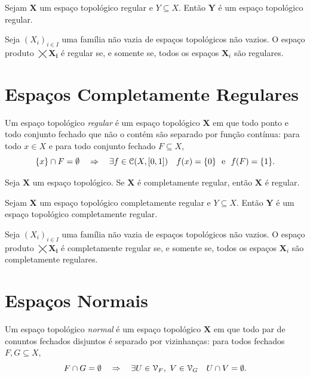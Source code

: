 \begin{prop}
	Sejam $\bm X$ um espaço topológico regular e $Y \subseteq X$. Então $\bm Y$ é um espaço topológico regular.
\end{prop}

\begin{prop}
	Seja $(X_i)_{i \in I}$ uma família não vazia de espaços topológicos não vazios. O espaço produto $\bm{\bigtimes X_i}$ é regular se, e somente se, todos os espaços $\bm X_i$ são regulares.
\end{prop}

\section{Espaços Completamente Regulares}

\begin{defi}
	Um espaço topológico \emph{regular} é um espaço topológico $\bm X$ em que todo ponto e todo conjunto fechado que não o contém são separado por função contínua: para todo $x \in X$ e para todo conjunto fechado $F \subseteq X$,
	\begin{equation*}
	\{x\} \cap F=\emptyset \quad \Rightarrow \quad \exists f \in \mathcal{C}(X,[0,1]) \quad f(x)=\{0\} \text{\ \ e\ \ } f(F)=\{1\}.
	\end{equation*}
\end{defi}

\begin{prop}
	Seja $\bm X$ um espaço topológico. Se $\bm X$ é completamente regular, então $\bm X$ é regular.
\end{prop}

\begin{prop}
	Sejam $\bm X$ um espaço topológico completamente regular e $Y \subseteq X$. Então $\bm Y$ é um espaço topológico completamente regular.
\end{prop}

\begin{prop}
	Seja $(X_i)_{i \in I}$ uma família não vazia de espaços topológicos não vazios. O espaço produto $\bm{\bigtimes X_i}$ é completamente regular se, e somente se, todos os espaços $\bm X_i$ são completamente regulares.
\end{prop}

\section{Espaços Normais}

\begin{defi}
	Um espaço topológico \emph{normal} é um espaço topológico $\bm X$ em que todo par de conuntos fechados disjuntos é separado por vizinhanças: para todos fechados $F,G \subseteq X$,
	\begin{equation*}
	F \cap G = \emptyset \quad \Rightarrow \quad \exists U \in \mathcal{V}_F,\ V \in \mathcal{V}_G \quad U \cap V = \emptyset.
	\end{equation*}
\end{defi}

